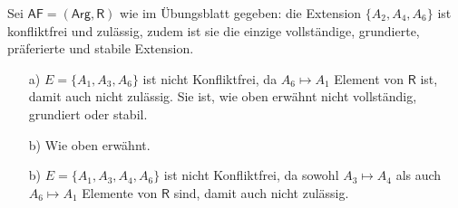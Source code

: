 Sei $\mathsf{AF}=(\mathsf{Arg}, \mathsf{R})$ wie im Übungsblatt gegeben: die Extension $\{A_2, A_4, A_6\}$ ist konfliktfrei und zulässig, zudem ist sie die einzige vollständige, grundierte, präferierte und stabile Extension.

\begin{enumerate}
	\item[a)] $E=\{A_1, A_3, A_6\}$ ist nicht Konfliktfrei, da $A_6\mapsto A_1$ Element von $\mathsf{R}$ ist, damit auch nicht zulässig. Sie ist, wie oben erwähnt nicht vollständig, grundiert oder stabil.
	
	\item[b)] Wie oben erwähnt.
	
	\item[b)] $E=\{A_1, A_3, A_4, A_6\}$ ist nicht Konfliktfrei, da sowohl $A_3\mapsto A_4$ als auch $A_6\mapsto A_1$ Elemente von $\mathsf{R}$ sind, damit auch nicht zulässig.
\end{enumerate}
